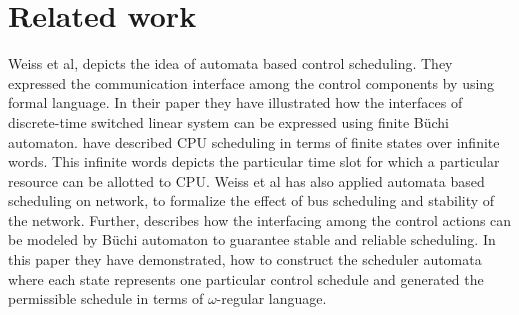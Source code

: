 \section{Related work}
\noindent
Weiss et al\cite{WeissA07}, depicts the idea of automata based control scheduling. They expressed
the communication interface among the control components by using formal language. In their
paper they have illustrated how the interfaces of discrete-time switched linear system
can be expressed using finite B\"{u}chi automaton. \cite{AlurW08} have described CPU scheduling
in terms of finite states over infinite words. This infinite words depicts the particular time 
slot for which a particular resource can be allotted to CPU. Weiss et al\cite{WeissFAA09} has also 
applied automata based scheduling on network, to formalize the effect of bus scheduling
and stability of the network. Further, \cite{GhoshMDHD16} describes how the interfacing among 
the control actions can be modeled by B\"{u}chi automaton to guarantee stable and reliable
scheduling. In this paper they have demonstrated, how to construct the scheduler automata 
where each state represents one particular control schedule and generated the permissible 
schedule in terms of $\omega$-regular language.


